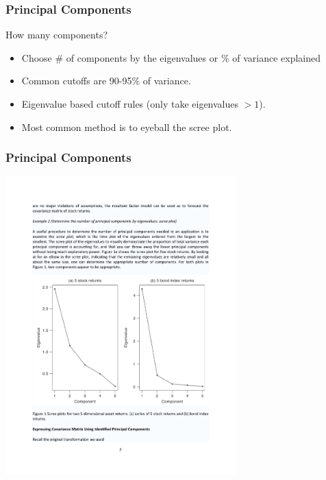 \documentclass[xcolor=pdftex,dvipsnames,table,mathserif]{beamer}
\begin{document}
\begin{frame}
\frametitle{Principal Components}
How many components?
\begin{itemize}
\item Choose \# of components by the eigenvalues or \% of variance explained
\item Common cutoffs are 90-95\% of variance.
\item Eigenvalue based cutoff rules (only take eigenvalues $ > 1$).
\item Most common method is to eyeball the scree plot.
\end{itemize}
\end{frame}


\begin{frame}
\frametitle{Principal Components}
\begin{center}
\includegraphics[width=3.5in]{./resources/princomp1}
\end{center}
\end{frame}
\end{document}
